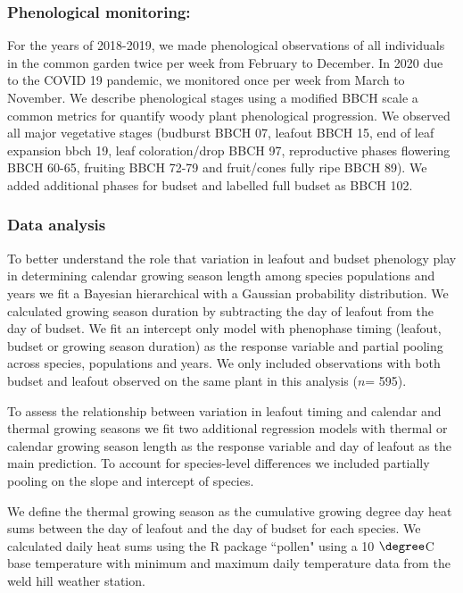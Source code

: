 \documentclass{article}[12pt]
\begin{document}
\subsubsection{Phenological monitoring:}
For the years of 2018-2019, we made phenological observations of all individuals in the common garden twice per week from February to December. In 2020 due to the COVID 19 pandemic, we monitored once per week from March to November. We describe phenological stages using a modified BBCH scale \citep{Finn2007} a common metrics for quantify woody plant phenological progression. We observed all major vegetative stages (budburst BBCH 07, leafout BBCH 15, end of leaf expansion bbch 19, leaf coloration/drop BBCH 97, reproductive phases flowering BBCH 60-65, fruiting BBCH 72-79 and fruit/cones fully ripe BBCH 89). We added additional phases for budset and labelled full budset as BBCH 102. 

\subsubsection{Data analysis}
To better understand the role that variation in leafout and budset phenology play in determining calendar growing season length among species populations and years we fit a Bayesian hierarchical with a Gaussian probability distribution. We calculated growing season duration by subtracting the day of leafout from the day of budset. We fit an intercept only model with phenophase timing (leafout, budset or growing season duration) as the response variable and partial pooling across species, populations and years. We only included observations with both budset and leafout observed on the same plant in this analysis ($n$= 595).

To assess the relationship between variation in leafout timing and calendar and thermal growing seasons we fit two additional regression models with thermal or calendar growing season length as the response variable and day of leafout as the main prediction. To account for species-level differences we included partially pooling on the slope and intercept of species.

We define the thermal growing season as the cumulative growing degree day heat sums between the day of leafout and the day of budset for each species. We calculated daily heat sums using the R package ``pollen" \citep{Nowosad2019} using a 10 $\degree$C base temperature with minimum and maximum daily temperature data from the weld hill weather station.
\end{document}
